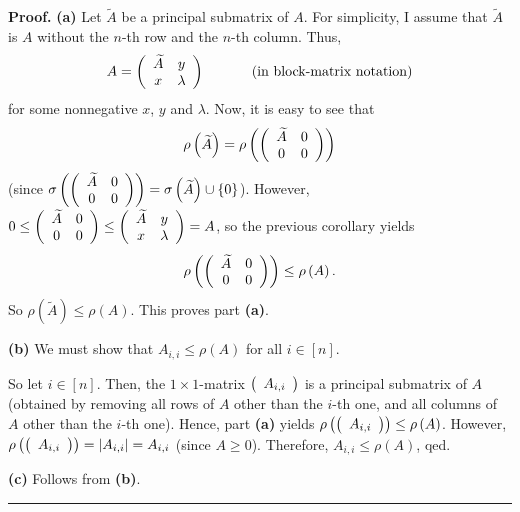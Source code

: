 \documentclass[numbers=enddot,12pt,final,onecolumn,notitlepage]{scrartcl}%
\numberwithin{exer}{subsection}
\theoremstyle{definition}
\newenvironment{proof}[1][Proof]{\noindent\textbf{#1.} }{\ \rule{0.5em}{0.5em}}
\begin{document}
\begin{proof}
\textbf{(a)} Let $\widetilde{A}$ be a principal submatrix of $A$. For
simplicity, I assume that $\widetilde{A}$ is $A$ without the $n$-th row and
the $n$-th column. Thus,%
\[
A=\left(
\begin{array}
[c]{cc}%
\widetilde{A} & y\\
x & \lambda
\end{array}
\right)  \ \ \ \ \ \ \ \ \ \ \left(  \text{in block-matrix notation}\right)
\]
for some nonnegative $x$, $y$ and $\lambda$. Now, it is easy to see that%
\[
\rho\left(  \widetilde{A}\right)  =\rho\left(  \left(
\begin{array}
[c]{cc}%
\widetilde{A} & 0\\
0 & 0
\end{array}
\right)  \right)
\]
(since $\sigma\left(  \left(
\begin{array}
[c]{cc}%
\widetilde{A} & 0\\
0 & 0
\end{array}
\right)  \right)  =\sigma\left(  \widetilde{A}\right)  \cup\left\{  0\right\}
$). However, $0\leq\left(
\begin{array}
[c]{cc}%
\widetilde{A} & 0\\
0 & 0
\end{array}
\right)  \leq\left(
\begin{array}
[c]{cc}%
\widetilde{A} & y\\
x & \lambda
\end{array}
\right)  =A$, so the previous corollary yields%
\[
\rho\left(  \left(
\begin{array}
[c]{cc}%
\widetilde{A} & 0\\
0 & 0
\end{array}
\right)  \right)  \leq\rho\left(  A\right)  .
\]
So $\rho\left(  \widetilde{A}\right)  \leq\rho\left(  A\right)  $. This proves
part \textbf{(a)}.

\textbf{(b)} We must show that $A_{i,i}\leq\rho\left(  A\right)  $ for all
$i\in\left[  n\right]  $.

So let $i\in\left[  n\right]  $. Then, the $1\times1$-matrix $\left(
\begin{array}
[c]{c}%
A_{i,i}%
\end{array}
\right)  $ is a principal submatrix of $A$ (obtained by removing all rows of
$A$ other than the $i$-th one, and all columns of $A$ other than the $i$-th
one). Hence, part \textbf{(a)} yields $\rho\left(  \left(
\begin{array}
[c]{c}%
A_{i,i}%
\end{array}
\right)  \right)  \leq\rho\left(  A\right)  $. However, $\rho\left(  \left(
\begin{array}
[c]{c}%
A_{i,i}%
\end{array}
\right)  \right)  =\left\vert A_{i,i}\right\vert =A_{i,i}$ (since $A\geq0$).
Therefore, $A_{i,i}\leq\rho\left(  A\right)  $, qed.

\textbf{(c)} Follows from \textbf{(b)}.
\end{proof}
\end{document}
